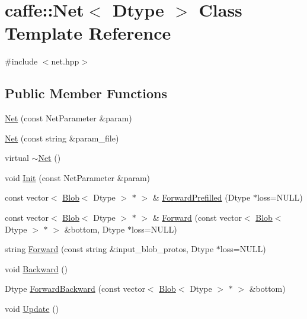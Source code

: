 \hypertarget{classcaffe_1_1_net}{\section{caffe\+:\+:Net$<$ Dtype $>$ Class Template Reference}
\label{classcaffe_1_1_net}
}


{\ttfamily \#include $<$net.\+hpp$>$}

\subsection*{Public Member Functions}
\begin{DoxyCompactItemize}
\item 
\hyperlink{classcaffe_1_1_net_a5a5655a49c702c6c4a2f5bd7bf7adf12}{Net} (const Net\+Parameter \&param)
\item 
\hyperlink{classcaffe_1_1_net_adda8f582b67677815d77dfc14946772b}{Net} (const string \&param\+\_\+file)
\item 
virtual \hyperlink{classcaffe_1_1_net_adb39f6b979f88d3408992d29d70d3454}{$\sim$\+Net} ()
\item 
void \hyperlink{classcaffe_1_1_net_ae9fcfaabc89165d6c0cb4b14b4c6b584}{Init} (const Net\+Parameter \&param)
\item 
const vector$<$ \hyperlink{classcaffe_1_1_blob}{Blob}$<$ Dtype $>$ $\ast$ $>$ \& \hyperlink{classcaffe_1_1_net_a7e2fd4143799072b500bc8ced53353cd}{Forward\+Prefilled} (Dtype $\ast$loss=N\+U\+L\+L)
\item 
const vector$<$ \hyperlink{classcaffe_1_1_blob}{Blob}$<$ Dtype $>$ $\ast$ $>$ \& \hyperlink{classcaffe_1_1_net_ad12d1ab8e1beb2e407e82454b174f83a}{Forward} (const vector$<$ \hyperlink{classcaffe_1_1_blob}{Blob}$<$ Dtype $>$ $\ast$ $>$ \&bottom, Dtype $\ast$loss=N\+U\+L\+L)
\item 
string \hyperlink{classcaffe_1_1_net_ad97c5e2984017e0a893a5c396fc8beb8}{Forward} (const string \&input\+\_\+blob\+\_\+protos, Dtype $\ast$loss=N\+U\+L\+L)
\item 
void \hyperlink{classcaffe_1_1_net_a7a1a6d17347106dd1284b1b6d28cb4e9}{Backward} ()
\item 
Dtype \hyperlink{classcaffe_1_1_net_ac735151133dcdc9e4ece8eca6c8c3835}{Forward\+Backward} (const vector$<$ \hyperlink{classcaffe_1_1_blob}{Blob}$<$ Dtype $>$ $\ast$ $>$ \&bottom)
\item 
void \hyperlink{classcaffe_1_1_net_a8a2544cefc59d6cbe1bf634f5d5be1c5}{Update} ()
\item 

\end{DoxyCompactItemize}
